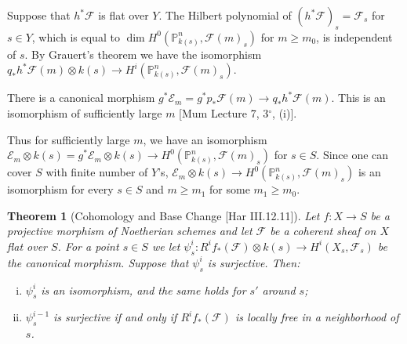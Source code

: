 \documentclass{article}
\theoremstyle{theorem}
\newtheorem{theorem}{Theorem}[section]
\begin{document}
    Suppose that $h^*\mathcal F$ is flat over $Y$. The Hilbert polynomial of $(h^* \mathcal F)_s = \mathcal F_s$ for $s \in Y$, which is equal to $\dim H^0(\mathbb P^n_{k(s)}, \mathcal F(m)_s)$ for $m \geq m_0$, is independent of $s$. By Grauert's theorem we have the isomorphism $q_*h^*\mathcal F(m) \otimes k(s) \rightarrow H^i(\mathbb P^n_{k(s)}, \mathcal F(m)_s)$.
    
    There is a canonical morphism $g^*\mathcal E_m = g^*p_* \mathcal F(m) \rightarrow q_*h^*\mathcal F(m).$ This is an isomorphism of sufficiently large $m$ {[Mum Lecture 7, 3$^\circ$, (i)]}.
    
    Thus for sufficiently large $m$, we have an isomorphism $\mathcal E_m \otimes k(s) = g^*\mathcal E_m \otimes k(s) \rightarrow H^0(\mathbb P^n_{k(s)}, \mathcal F(m)_s)$ for $s \in S$. Since one can cover $S$ with finite number of $Y$'s, $\mathcal E_m \otimes k(s) \rightarrow H^0(\mathbb P^n_{k(s)}, \mathcal F(m)_s)$ is an isomorphism for every $s \in S$ and $m \geq m_1$ for some $m_1 \geq m_0$.
    \newpage
    
    \begin{theorem} [Cohomology and Base Change {[Har III.12.11]}] \label{cohomology_base_change}
        Let $f : X \rightarrow S$ be a projective morphism of Noetherian schemes and let $\mathcal F$ be a coherent sheaf on $X$ flat over $S$. For a point $s \in S$ we let $\psi^i_s : R^if_*(\mathcal F) \otimes k(s) \rightarrow H^i(X_s, \mathcal F_s)$ be the canonical morphism. Suppose that $\psi^i_s$ is surjective. Then:
        \begin{enumerate}[(i)]
            \item $\psi^i_s$ is an isomorphism, and the same holds for $s'$ around $s$;
            \item $\psi^{i-1}_s$ is surjective if and only if $R^if_*(\mathcal F)$ is locally free in a neighborhood of $s$.
        \end{enumerate}
    \end{theorem}
    
\end{document}
